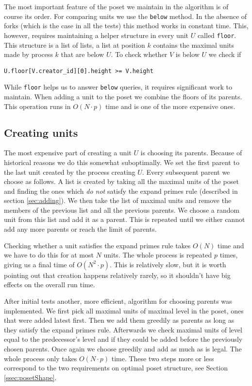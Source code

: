 \documentclass[a4paper,10pt]{article}
\begin{document}
			The most important feature of the poset we maintain in the algorithm is of course its order.
			For comparing units we use the \lstinline{below} method. In the absence of forks (which is the case in all the tests) this method works in constant time.
			This, however, requires maintaining a helper structure in every unit $U$ called \lstinline{floor}.
			This structure is a list of lists, a list at position $k$ contains the maximal units made by process $k$ that are below $U$.
			To check whether $V$ is below $U$ we check if
			\begin{lstlisting}
U.floor[V.creator_id][0].height >= V.height
			\end{lstlisting}
			While \lstinline{floor} helps us to answer \lstinline{below} queries, it requires significant work to maintain. When adding a unit to the poset we combine the floors of its parents.
			This operation runs in $O(N \cdot p)$ time and is one of the more expensive ones.
		\subsection{Creating units}
		 \label{sec:creation}
			The most expensive part of creating a unit $U$ is choosing its parents. Because of historical reasons we do this somewhat suboptimally.
			We set the first parent to the last unit created by the process creating $U$. Every subsequent parent we choose as follows.
			A list is created by taking all the maximal units of the poset and finding the ones which \emph{do not} satisfy the expand primes rule (described in section \ref{sec:adding}).
			We then take the list of maximal units and remove the members of the previous list and all the previous parents.
			We choose a random unit from this list and add it as a parent. This is repeated until we either cannot add any more parents or reach the limit of parents.

			Checking whether a unit satisfies the expand primes rule takes $O(N)$ time and we have to do this for at most $N$ units.
			The whole process is repeated $p$ times, giving us a final time of $O(N^2 \cdot p)$.
			This is relatively slow, but it is worth pointing out that creation happens relatively rarely, so it shouldn't have big effects on the overall run time.

			After initial tests another, more efficient, algorithm for choosing parents was implemented.
			We first pick all maximal units of maximal level in the poset, ones that were added latest first.
			Then we add them greedily as parents as long as they satisfy the expand primes rule.
			Afterwards we check maximal units of level equal to the predecessor's level and if they could be added before the previously chosen parents.
			Once again we choose greedily and add as much as is legal. The whole process only takes $O(N \cdot p)$ time.
			These two steps more or less correspond to the two requirements on optimal poset structure, see Section \ref{ssec:posetShape}.
\end{document}
